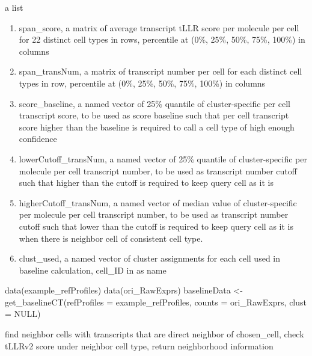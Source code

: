 \documentclass[letterpaper]{book}
\begin{document}
\begin{Value}
a list
\begin{enumerate}

\item{} span\_score, a matrix of average transcript tLLR score per molecule per cell for 22 distinct cell types in rows, percentile at (0\%, 25\%, 50\%, 75\%, 100\%) in columns
\item{} span\_transNum, a matrix of transcript number per cell for each distinct cell types in row, percentile at (0\%, 25\%, 50\%, 75\%, 100\%) in columns
\item{} score\_baseline, a named vector of 25\% quantile of cluster-specific per cell transcript score, to be used as score baseline such that  per cell transcript score higher than the baseline is required to call a cell type of high enough confidence
\item{} lowerCutoff\_transNum, a named vector of 25\% quantile of cluster-specific per molecule per cell transcript number, to be used as transcript number cutoff such that higher than the cutoff is required to keep query cell as it is
\item{} higherCutoff\_transNum, a named vector of median value of cluster-specific per molecule per cell transcript number, to be used as transcript number cutoff such that lower than the cutoff is required to keep query cell as it is when there is neighbor cell of consistent cell type.
\item{} clust\_used,  a named vector of cluster assignments for each cell used in baseline calculation, cell\_ID in  as name

\end{enumerate}

\end{Value}
%
\begin{Examples}
\begin{ExampleCode}
data(example_refProfiles)
data(ori_RawExprs)
baselineData <- get_baselineCT(refProfiles = example_refProfiles, 
                               counts = ori_RawExprs, clust = NULL)
\end{ExampleCode}
\end{Examples}
%
\begin{Description}
find neighbor cells with transcripts that are direct neighbor of chosen\_cell, check tLLRv2 score under neighbor cell type, return neighborhood information
\end{Description}
\end{document}

